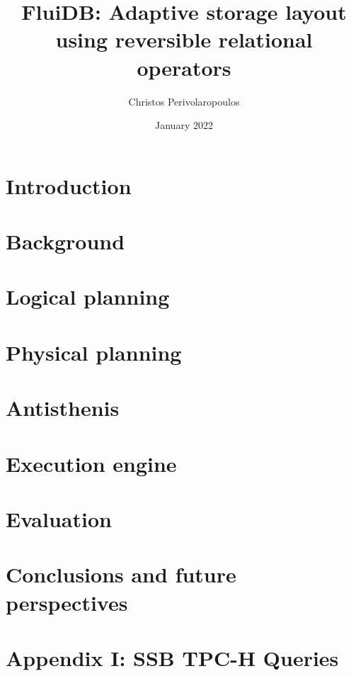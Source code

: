 \documentclass[fontsize=12pt,paper=letter,twosided,cleardoublepage=plain,final]{scrbook}
\title{FluiDB: Adaptive storage layout using reversible relational operators}
\author{Christos Perivolaropoulos}
\date{January 2022}
\begin{document}
\frontmatter


\mainmatter
{}
\chapter{Introduction}
\label{chapter:introduction}


\chapter{Background}
\label{chapter:background}


\chapter{Logical planning}
\label{chapter:fluidb_logical_planning}


\chapter{Physical planning}
\label{chapter:physical_planning}


\chapter{Antisthenis}
\label{chapter:antisthenis}


\chapter{Execution engine}
\label{chapter:execution_engine}


\chapter{Evaluation}
\label{chapter:evaluation}


\chapter{Conclusions and future perspectives}
\label{chapter:conclusion}


\appendix
\chapter{Appendix I: SSB TPC-H Queries}
\label{chapter:appendix}

\end{document}
